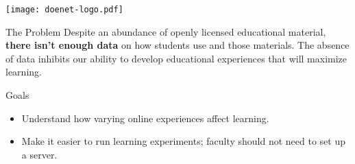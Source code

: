 \vspace{-1.5in}
\texttt{[image: doenet-logo.pdf]}

\begin{sectionblock}{The Problem}
  Despite an abundance of openly licensed educational material, \textbf{there
  isn't enough data} on how students use and those materials.  The
  absence of data inhibits our ability to develop educational
  experiences that will maximize learning.
\end{sectionblock}

\begin{sectionblock}{Goals}
  \begin{itemize}
  \item Understand how varying online experiences affect learning.
  \item Make it easier to run learning experiments; faculty should not need to set up a server.
  \end{itemize}
\end{sectionblock}
  






